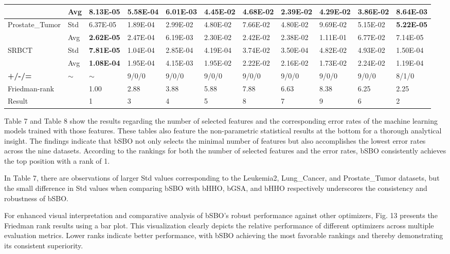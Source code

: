 \documentclass{article} %
\begin{document}
\begin{tabular}{|p{0.4in}|p{0.4in}|p{0.4in}|p{0.4in}|p{0.4in}|p{0.4in}|p{0.4in}|p{0.4in}|p{0.4in}|p{0.4in}|p{0.4in}|}
 & Avg & \textbf{8.13E-05} & 5.58E-04 & 6.01E-03 & 4.45E-02 & 4.68E-02 & 2.39E-02 & 4.29E-02 & 3.86E-02 & 8.64E-03 \\ \hline 
Prostate\_Tumor & Std & 6.37E-05 & 1.89E-04 & 2.99E-02 & 4.80E-02 & 7.66E-02 & 4.80E-02 & 9.69E-02 & 5.15E-02 & \textbf{5.22E-05} \\ \hline 
 & Avg & \textbf{2.62E-05} & 2.47E-04 & 6.19E-03 & 2.30E-02 & 2.42E-02 & 2.38E-02 & 1.11E-01 & 6.77E-02 & 7.14E-05 \\ \hline 
SRBCT & Std & \textbf{7.81E-05} & 1.04E-04 & 2.85E-04 & 4.19E-04 & 3.74E-02 & 3.50E-04 & 4.82E-02 & 4.93E-02 & 1.50E-04 \\ \hline 
\textbf{} & Avg & \textbf{1.08E-04} & 1.95E-04 & 4.15E-03 & 1.95E-02 & 2.22E-02 & 2.16E-02 & 1.73E-02 & 2.24E-02 & 1.19E-04 \\ \hline 
\textbf{+/-/=} & $\mathrm{\sim}$ & $\mathrm{\sim}$ & 9/0/0 & 9/0/0 & 9/0/0 & 9/0/0 & 9/0/0 & 9/0/0 & 9/0/0 & 8/1/0 \\ \hline 
Friedman-rank &  & 1.00  & 2.88  & 3.88  & 5.88  & 7.88  & 6.63  & 8.38  & 6.25  & 2.25  \\ \hline 
Result &  & 1 & 3 & 4 & 5 & 8 & 7 & 9 & 6 & 2 \\ \hline 
\end{tabular}



Table 7 and Table 8 show the results regarding the number of selected features and the corresponding error rates of the machine learning models trained with those features. These tables also feature the non-parametric statistical results at the bottom for a thorough analytical insight. The findings indicate that bSBO not only selects the minimal number of features but also accomplishes the lowest error rates across the nine datasets. According to the rankings for both the number of selected features and the error rates, bSBO consistently achieves the top position with a rank of 1.

In Table 7, there are observations of larger Std values corresponding to the Leukemia2, Lung\_Cancer, and Prostate\_Tumor datasets, but the small difference in Std values when comparing bSBO with bHHO, bGSA, and bHHO respectively underscores the consistency and robustness of bSBO.

For enhanced visual interpretation and comparative analysis of bSBO's robust performance against other optimizers, Fig. 13 presents the Friedman rank results using a bar plot. This visualization clearly depicts the relative performance of different optimizers across multiple evaluation metrics. Lower ranks indicate better performance, with bSBO achieving the most favorable rankings and thereby demonstrating its consistent superiority.
\end{document}
